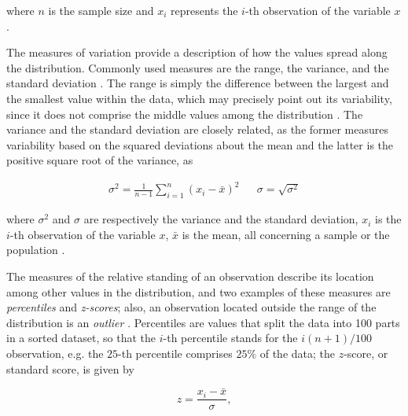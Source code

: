 \noindent where $n$ is the sample size and $x_{i}$ represents the $i$-th observation of the variable $x$ \cite{zwillinger1999crc}.


The measures of variation provide a description of how the values spread along the distribution. Commonly used measures are the range, the variance, and the standard deviation \cite{mendenhall2016statistics}. The range is simply the difference between the largest and the smallest value within the data, which may precisely point out its variability, since it does not comprise the middle values among the distribution \cite{devore2011probability}. The variance and the standard deviation are closely related, as the former measures variability based on the squared deviations about
the mean and the latter is the positive square root of the variance, as

\begin{align}
\label{eqn:variance_std}
\sigma^{2} = \frac{1}{n - 1} \sum_{i = 1}^{n} \left(x_{i} - \bar{x}\right)^{2}
&&
\sigma = \sqrt{\sigma^{2}}
\end{align}

\noindent where $\sigma^{2}$ and $\sigma$ are respectively the variance and the standard deviation, $x_{i}$ is the $i$-th observation of the variable $x$, $\bar{x}$ is the mean, all concerning a sample or the population \cite{zwillinger1999crc}.


The measures of the relative standing of an observation describe its location among other values in the distribution, and two examples of these measures are \emph{percentiles} and \emph{z-scores}; also, an observation located outside the range of the distribution is an \emph{outlier} \cite{mendenhall2016statistics}. Percentiles are values that split the data into 100 parts in a sorted dataset, so that the $i$-th percentile stands for the $i(n + 1) / 100$ observation, e.g. the $25$-th percentile comprises $25\%$ of the data; the $z$-score, or standard score, is given by

\begin{equation}
\label{eqn:z_score}
z = \frac{x_{i} - \bar{x}}{\sigma},
\end{equation}


